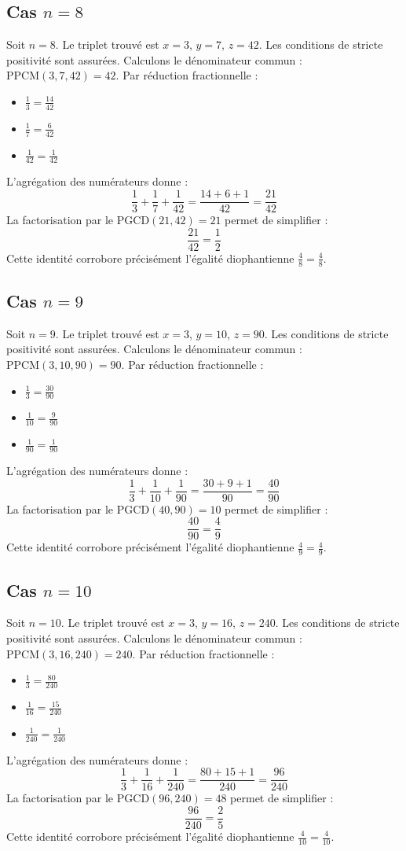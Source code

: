 \documentclass[11pt,a4paper]{article}
\begin{document}
\subsection{Cas $n = 8$}
Soit $n = 8$. Le triplet trouvé est $x = 3$, $y = 7$, $z = 42$.
Les conditions de stricte positivité sont assurées.
Calculons le dénominateur commun : $\text{PPCM}(3, 7, 42) = 42$.
Par réduction fractionnelle :
\begin{itemize}
    \item $\frac{1}{3} = \frac{14}{42}$
    \item $\frac{1}{7} = \frac{6}{42}$
    \item $\frac{1}{42} = \frac{1}{42}$
\end{itemize}
L'agrégation des numérateurs donne :
$$ \frac{1}{3} + \frac{1}{7} + \frac{1}{42} = \frac{14 + 6 + 1}{42} = \frac{21}{42} $$
La factorisation par le $\text{PGCD}(21, 42) = 21$ permet de simplifier :
$$ \frac{21}{42} = \frac{1}{2} $$
Cette identité corrobore précisément l'égalité diophantienne $\frac{4}{8} = \frac{4}{8}$.

\subsection{Cas $n = 9$}
Soit $n = 9$. Le triplet trouvé est $x = 3$, $y = 10$, $z = 90$.
Les conditions de stricte positivité sont assurées.
Calculons le dénominateur commun : $\text{PPCM}(3, 10, 90) = 90$.
Par réduction fractionnelle :
\begin{itemize}
    \item $\frac{1}{3} = \frac{30}{90}$
    \item $\frac{1}{10} = \frac{9}{90}$
    \item $\frac{1}{90} = \frac{1}{90}$
\end{itemize}
L'agrégation des numérateurs donne :
$$ \frac{1}{3} + \frac{1}{10} + \frac{1}{90} = \frac{30 + 9 + 1}{90} = \frac{40}{90} $$
La factorisation par le $\text{PGCD}(40, 90) = 10$ permet de simplifier :
$$ \frac{40}{90} = \frac{4}{9} $$
Cette identité corrobore précisément l'égalité diophantienne $\frac{4}{9} = \frac{4}{9}$.

\subsection{Cas $n = 10$}
Soit $n = 10$. Le triplet trouvé est $x = 3$, $y = 16$, $z = 240$.
Les conditions de stricte positivité sont assurées.
Calculons le dénominateur commun : $\text{PPCM}(3, 16, 240) = 240$.
Par réduction fractionnelle :
\begin{itemize}
    \item $\frac{1}{3} = \frac{80}{240}$
    \item $\frac{1}{16} = \frac{15}{240}$
    \item $\frac{1}{240} = \frac{1}{240}$
\end{itemize}
L'agrégation des numérateurs donne :
$$ \frac{1}{3} + \frac{1}{16} + \frac{1}{240} = \frac{80 + 15 + 1}{240} = \frac{96}{240} $$
La factorisation par le $\text{PGCD}(96, 240) = 48$ permet de simplifier :
$$ \frac{96}{240} = \frac{2}{5} $$
Cette identité corrobore précisément l'égalité diophantienne $\frac{4}{10} = \frac{4}{10}$.
\end{document}
